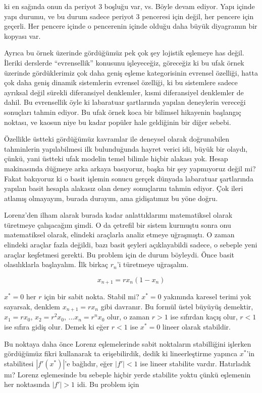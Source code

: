 \documentclass[12pt,fleqn]{article}\usepackage{../../common}
\begin{document}
ki en sağında onun da periyot 3 boşluğu var, vs. Böyle devam ediyor. Yapı
içinde yapı durumu, ve bu durum sadece periyot 3 penceresi için değil, her
pencere için geçerli. Her pencere içinde o pencerenin içinde olduğu daha
büyük diyagramın bir kopyası var. 

Ayrıca bu örnek üzerinde gördüğümüz pek çok şey lojistik eşlemeye has
değil. İleriki derslerde ``evrensellik'' konusunu işleyeceğiz, göreceğiz ki
bu ufak örnek üzerinde gördüklerimiz çok daha geniş eşleme kategorisinin
evrensel özelliği, hatta çok daha geniş dinamik sistemlerin evrensel
özelliği, ki bu sistemlere sadece ayrıksal değil sürekli diferansiyel
denklemler, kısmi diferansiyel denklemler de dahil. Bu evrensellik öyle ki
labaratuar şartlarında yapılan deneylerin vereceği sonuçları tahmin
ediyor. Bu ufak örnek koca bir bilimsel hikayenin başlangıç noktası, ve
kaosun niye bu kadar popüler hale geldiğinin bir diğer sebebi. 

Özellikle üstteki gördüğümüz kavramlar ile deneysel olarak doğrunabilen
tahminlerin yapılabilmesi ilk bulunduğunda hayret verici idi, büyük bir
olaydı, çünkü, yani üstteki ufak modelin temel bilimle hiçbir alakası
yok. Hesap makinasında düğmeye arka arkaya basıyoruz, başka bir şey
yapmıyoruz değil mi? Fakat bakıyoruz ki o basit işlemin sonucu gerçek
dünyada labaratuar şartlarında yapılan basit hesapla alakasız olan deney
sonuçlarını tahmin ediyor. Çok ileri atlamış olmayayım, burada durayım, ama
gidişatımız bu yöne doğru.

Lorenz'den ilham alarak burada kadar anlattıklarımı matematiksel olarak
türetmeye çalışacağım şimdi. O da çetrefil bir sistem kurmuştu sonra onu
matematiksel olarak, elindeki araçlarla analiz etmeye uğraşmıştı. O zaman
elindeki araçlar fazla değildi, bazı basit şeyleri açıklayabildi sadece, o
sebeple yeni araçlar keşfetmesi gerekti. Bu problem için de durum
böyleydi. Önce basit olasılıklarla başlayalım. İlk birkaç $r_n$'i türetmeye
uğraşalım.

$$ x_{n+1} = r x_n (1-x_n) $$

$x^\ast=0$ her $r$ için bir sabit nokta. Stabil mi? $x^\ast=0$ yakınında karesel
terimi yok sayarsak, denklem $x_{n+1} = r x_n$ gibi davranır. Bu formül
üstel büyüyüş demektir, $x_1=rx_0$, $x_2=r^2x_0$, ...$x_n=r^n x_0$  olur, o
zaman $r>1$ ise sıfırdan kaçış olur, $r<1$ ise sıfıra gidiş olur. Demek ki
eğer $r<1$ ise $x^\ast=0$ lineer olarak stabildir. 

Bu noktaya daha önce Lorenz eşlemelerinde sabit noktaların stabilliğini
işlerken gördüğümüz fikri kullanarak ta erişebilirdik, dedik ki
lineerleştirme yapınca $x^\ast$'in stabilitesi $|f'(x^\ast)|$'e bağlıdır, eğer
$|f'| < 1$ ise lineer stabilite vardır. Hatırladık mı? Lorenz eşlemesinde
bu sebeple hiçbir yerde stabilite yoktu çünkü eşlemenin her noktasında
$|f'| > 1$ idi. Bu problem için
\end{document}
